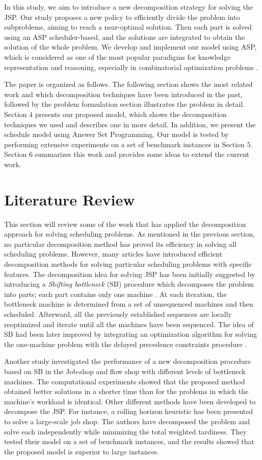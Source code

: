 \documentclass{tlp} %
\begin{document}
In this study, we aim to introduce a new decomposition strategy for solving the JSP. Our study proposes a new policy to efficiently divide the problem into subproblems, aiming to reach a near-optimal solution. Then each part is solved using an ASP scheduler-based, and the solutions are integrated to obtain the solution of the whole problem. We develop and implement our model using ASP, which is considered as one of the most popular paradigms for knowledge representation and reasoning, especially in combinatorial optimization problems \cite{abseher2016shift}. 

The paper is organized as follows. The following section shows the most related work and which decomposition techniques have been introduced in the past, followed by the problem formulation section illustrates the problem in detail. Section $4$ presents our proposed model, which shows the decomposition techniques we used and describes one in more detail. In addition, we present the schedule model using Answer Set Programming. Our model is tested by performing extensive experiments on a set of benchmark instances in Section $5$. Section $6$ summarizes this work and provides some ideas to extend the current work.

\section{Literature Review}
This section will review some of the work that has applied the decomposition approach for solving scheduling problems. As mentioned in the previous section, no particular decomposition method has proved its efficiency in solving all scheduling problems. However, many articles have introduced efficient decomposition methods for solving particular scheduling problems with specific features. The decomposition idea for solving JSP has been initially suggested by introducing a \textit{Shifting bottleneck} (SB) procedure which decomposes the problem into parts; each part contains only one machine \cite{adams1988shifting}. At each iteration, the bottleneck machine is determined from a set of unsequenced machines and then scheduled. Afterward, all the previously established sequences are locally reoptimized and iterate until all the machines have been sequenced. The idea of SB had been later improved by integrating an optimization algorithm for solving the one-machine problem with the delayed precedence constraints procedure \cite{balas1995one}.

Another study investigated the performance of a new decomposition procedure based on SB in the Job-shop and flow shop with different levels of bottleneck machines. The computational experiments showed that the proposed method obtained better solutions in a shorter time than for the problems in which the machine's workload is identical. Other different methods have been developed to decompose the JSP. For instance, a rolling horizon heuristic has been presented \cite{singer2001decomposition} to solve a large-scale job shop. The authors have decomposed the problem and solve each independently while minimizing the total weighted tardiness. They tested their model on a set of benchmark instances, and the results showed that the proposed model is superior to large instances. 
\end{document}
